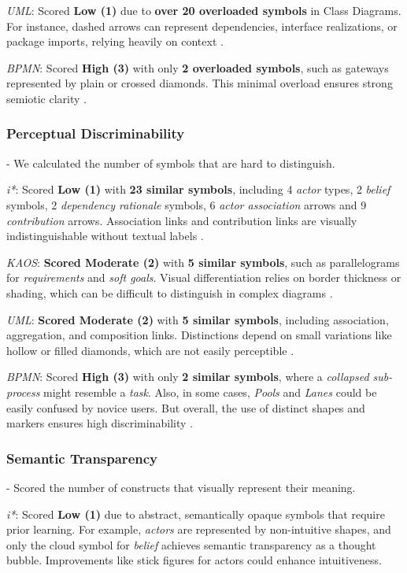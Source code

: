 \documentclass[runningheads]{llncs}
\begin{document}
\textit{UML}: Scored \textbf{Low (1)} due to \textbf{over 20 overloaded symbols} in Class Diagrams. For instance, dashed arrows can represent dependencies, interface realizations, or package imports, relying heavily on context \cite{Moody2008}.

\textit{BPMN}: Scored \textbf{High (3)} with only \textbf{2 overloaded symbols}, such as gateways represented by plain or crossed diamonds. This minimal overload ensures strong semiotic clarity \cite{Genon2011}.

\subsubsection{Perceptual Discriminability} - We calculated the number of symbols that are hard to distinguish. 

\textit{i*}: Scored\textbf{ Low (1)} with \textbf{23 similar symbols}, including 4\textit{ actor} types, 2 \textit{belief} symbols, 2 \textit{dependency rationale} symbols, 6 \textit{actor association} arrows and 9 \textit{contribution} arrows. Association links and contribution links are visually indistinguishable without textual labels \cite{Moody2010}.

\textit{KAOS}: \textbf{Scored Moderate (2)} with \textbf{5 similar symbols}, such as parallelograms for \textit{requirements} and\textit{ soft goals}. Visual differentiation relies on border thickness or shading, which can be difficult to distinguish in complex diagrams \cite{Matulevicius2007}.

\textit{UML}: \textbf{Scored Moderate (2)} with\textbf{ 5 similar symbols}, including association, aggregation, and composition links. Distinctions depend on small variations like hollow or filled diamonds, which are not easily perceptible \cite{Moody2008}.

\textit{BPMN}: Scored \textbf{High (3)} with only \textbf{2 similar symbols}, where a \textit{collapsed sub-process} might resemble a\textit{ task}. Also, in some cases, \textit{Pools} and \textit{Lanes} could be easily confused by novice users. But overall, the use of distinct shapes and markers ensures high discriminability \cite{Moody2010}.

\subsubsection{Semantic Transparency} - Scored the number of constructs that visually represent their meaning. 

\textit{i*}: Scored \textbf{Low (1)} due to abstract, semantically opaque symbols that require prior learning. For example, \textit{actors} are represented by non-intuitive shapes, and only the cloud symbol for \textit{belief} achieves semantic transparency as a thought bubble. Improvements like stick figures for actors could enhance intuitiveness\cite{Moody2010}.
\end{document}
